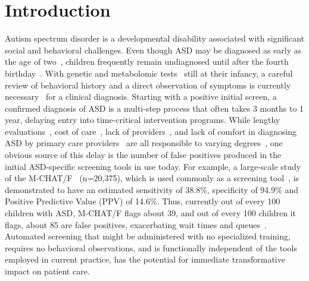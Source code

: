 \documentclass[onecolumn,,10pt]{IEEEtran}
\begin{document}
\section*{Introduction}
% 
Autism spectrum disorder is a developmental disability associated with significant social  and behavioral challenges.
Even though ASD may be diagnosed as early as the  age of two~\cite{cdc},  children frequently remain undiagnosed  until after the fourth birthday~\cite{pmid24529515}. With genetic and metabolomic tests~\cite{howsmon2017classification,li2018high,hicks2018validation,smith2020metabolomics} still at their infancy,  a careful review of behavioral history and a direct
observation of symptoms is currently
necessary~\cite{volkmar2014practice,hyman2020identification} for a clinical diagnosis.  Starting with a positive initial screen, a confirmed diagnosis of ASD is a   multi-step process that often takes 3 months to 1 year,  delaying entry into time-critical intervention programs. While   lengthy evaluations~\cite{kalb2012determinants}, cost of care~\cite{bisgaier2011access},  lack of providers~\cite{fenikile2015barriers}, and lack of comfort in diagnosing ASD by primary care providers~\cite{fenikile2015barriers} are all responsible to varying degrees~\cite{gordon2016whittling}, one  obvious source of this delay is the number of false positives produced in the initial ASD-specific screening tools in use today. For example, a large-scale study of the  M-CHAT/F~\cite{pmid31562252} (n=20,375), which is  used commonly as a screening tool~\cite{robins2014validation,hyman2020identification},  is demonstrated to have an estimated  sensitivity of 38.8\%, specificity of 94.9\% and Positive Predictive Value (PPV) of 14.6\%. Thus,  currently  out of every 100 children with ASD,  M-CHAT/F flags about 39, and out of every 100 children it flags, about 85 are false positives, exacerbating  wait times and queues~\cite{gordon2016whittling}.  Automated   screening  that might be administered with  no specialized training, requires no behavioral observations, and is functionally independent of the tools employed in current practice,  has the potential for  immediate transformative  impact on patient care.
\end{document}
